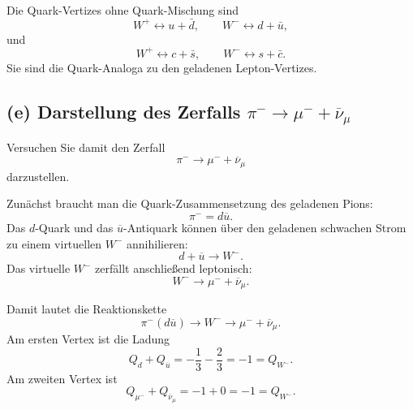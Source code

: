 \documentclass[11pt,a4paper]{scrartcl}
\begin{document}
\begin{answerbox}
Die Quark-Vertizes ohne Quark-Mischung sind
\[
\boxed{W^+ \leftrightarrow u+\bar d},
\qquad
\boxed{W^- \leftrightarrow d+\bar u},
\]
und
\[
\boxed{W^+ \leftrightarrow c+\bar s},
\qquad
\boxed{W^- \leftrightarrow s+\bar c}.
\]
Sie sind die Quark-Analoga zu den geladenen Lepton-Vertizes.
\end{answerbox}

\subsection*{(e) Darstellung des Zerfalls $\pi^-\to\mu^-+\overline\nu_\mu$}

Versuchen Sie damit den Zerfall
\[
\pi^- \to \mu^- + \overline\nu_\mu
\]
darzustellen.

\begin{calculationbox}
Zunächst braucht man die Quark-Zusammensetzung des geladenen Pions:
\[
\pi^- = d\overline u.
\]
Das $d$-Quark und das $\overline u$-Antiquark können über den geladenen schwachen Strom zu einem virtuellen $W^-$ annihilieren:
\[
d+\overline u \to W^-.
\]
Das virtuelle $W^-$ zerfällt anschließend leptonisch:
\[
W^-\to \mu^-+\overline\nu_\mu.
\]

\begin{calculationbox}
Damit lautet die Reaktionskette
\[
\pi^-(d\overline u)
\longrightarrow W^-
\longrightarrow \mu^-+\overline\nu_\mu.
\]
Am ersten Vertex ist die Ladung
\[
Q_d+Q_{\overline u}=-\frac13-\frac23=-1=Q_{W^-}.
\]
Am zweiten Vertex ist
\[
Q_{\mu^-}+Q_{\overline\nu_\mu}=-1+0=-1=Q_{W^-}.
\]
\end{calculationbox}

\begin{center}
\end{center}
\end{calculationbox}
\end{document}
